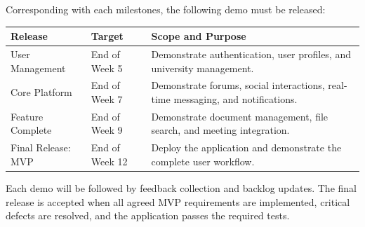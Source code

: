\documentclass[12pt]{article}
\renewcommand{\baselinestretch}{1.5}
\begin{document}
Corresponding with each milestones, the following demo must be released:
\par\medskip
\begingroup
\scriptsize
\renewcommand{\baselinestretch}{1.0}\selectfont
\renewcommand{\arraystretch}{1.15}
\setlength{\tabcolsep}{4pt}
\begin{longtable}{|>{\raggedright\arraybackslash}p{}|>{\raggedright\arraybackslash}p{}|>{\raggedright\arraybackslash}p{}|}
\hline
Release & Target & Scope and Purpose \\ \hline
\endhead
User Management & End of Week 5 & Demonstrate authentication, user profiles, and university management. \\ \hline
Core Platform & End of Week 7 & Demonstrate forums, social interactions, real-time messaging, and notifications. \\ \hline
Feature Complete & End of Week 9 & Demonstrate document management, file search, and meeting integration. \\ \hline
Final Release: MVP & End of Week 12 & Deploy the application and demonstrate the complete user workflow. \\ \hline
\end{longtable}
\endgroup
\par\medskip
Each demo will be followed by feedback collection and backlog updates. The final release is accepted when all agreed MVP requirements are implemented, critical defects are resolved, and the application passes the required tests.
\par\medskip
\hypertarget{sec:422-iteration-objectives}{}
\end{document}
